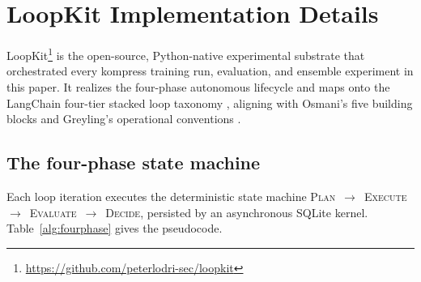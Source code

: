 \section{LoopKit Implementation Details}
\label{sec:loopkit}

LoopKit\footnote{\url{https://github.com/peterlodri-sec/loopkit}} is the
open-source, Python-native experimental substrate that orchestrated every
kompress training run, evaluation, and ensemble experiment in this paper. It
realizes the four-phase autonomous lifecycle and maps onto the LangChain
four-tier stacked loop taxonomy \citep{langchain2026loops}, aligning with
Osmani's five building blocks \citep{osmani2026loop} and Greyling's
operational conventions \citep{greyling2026loop}.

\subsection{The four-phase state machine}
\label{sec:loopkit:phases}

Each loop iteration executes the deterministic state machine
\textsc{Plan}~$\to$~\textsc{Execute}~$\to$~\textsc{Evaluate}~$\to$~\textsc{Decide},
persisted by an asynchronous SQLite kernel. Table~\ref{alg:fourphase}
gives the pseudocode.

